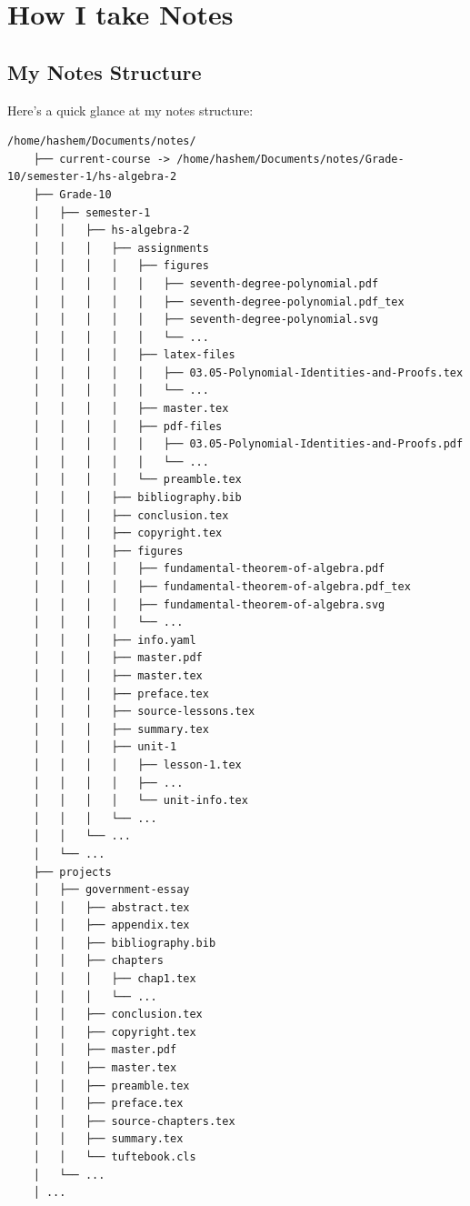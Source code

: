 \chapter{How I take Notes}
\label{chap:how_i_take_notes}

\section{My Notes Structure}
\label{sec:my_notes_structure}

Here's a quick glance at my notes structure:

\begin{frame}[fragile]
  \begin{lstlisting}[style=tree]
    /home/hashem/Documents/notes/
    ├── current-course -> /home/hashem/Documents/notes/Grade-10/semester-1/hs-algebra-2
    ├── Grade-10
    │   ├── semester-1
    │   │   ├── hs-algebra-2
    │   │   │   ├── assignments
    │   │   │   │   ├── figures
    │   │   │   │   │   ├── seventh-degree-polynomial.pdf
    │   │   │   │   │   ├── seventh-degree-polynomial.pdf_tex
    │   │   │   │   │   ├── seventh-degree-polynomial.svg
    │   │   │   │   │   └── ...
    │   │   │   │   ├── latex-files
    │   │   │   │   │   ├── 03.05-Polynomial-Identities-and-Proofs.tex
    │   │   │   │   │   └── ...
    │   │   │   │   ├── master.tex
    │   │   │   │   ├── pdf-files
    │   │   │   │   │   ├── 03.05-Polynomial-Identities-and-Proofs.pdf
    │   │   │   │   │   └── ...
    │   │   │   │   └── preamble.tex
    │   │   │   ├── bibliography.bib
    │   │   │   ├── conclusion.tex
    │   │   │   ├── copyright.tex
    │   │   │   ├── figures
    │   │   │   │   ├── fundamental-theorem-of-algebra.pdf
    │   │   │   │   ├── fundamental-theorem-of-algebra.pdf_tex
    │   │   │   │   ├── fundamental-theorem-of-algebra.svg
    │   │   │   │   └── ...
    │   │   │   ├── info.yaml
    │   │   │   ├── master.pdf
    │   │   │   ├── master.tex
    │   │   │   ├── preface.tex
    │   │   │   ├── source-lessons.tex
    │   │   │   ├── summary.tex
    │   │   │   ├── unit-1
    │   │   │   │   ├── lesson-1.tex
    │   │   │   │   ├── ...
    │   │   │   │   └── unit-info.tex
    │   │   │   └── ...
    │   │   └── ...
    │   └── ...
    ├── projects
    │   ├── government-essay
    │   │   ├── abstract.tex
    │   │   ├── appendix.tex
    │   │   ├── bibliography.bib
    │   │   ├── chapters
    │   │   │   ├── chap1.tex
    │   │   │   └── ...
    │   │   ├── conclusion.tex
    │   │   ├── copyright.tex
    │   │   ├── master.pdf
    │   │   ├── master.tex
    │   │   ├── preamble.tex
    │   │   ├── preface.tex
    │   │   ├── source-chapters.tex
    │   │   ├── summary.tex
    │   │   └── tuftebook.cls
    │   └── ...
    │ ...
  \end{lstlisting}
\end{frame}

